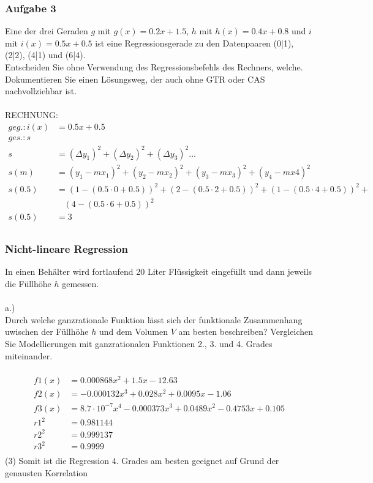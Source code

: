 \documentclass[a4paper,12pt]{article}
\begin{document}
\subsubsection{Aufgabe 3}
Eine der drei Geraden $g$ mit $g(x) = 0.2x + 1.5$, $h$ mit $h(x) = 0.4x + 0.8$
und $i$ mit $i(x) = 0.5x + 0.5$ ist eine Regressionsgerade zu den Datenpaaren (0|1), 
(2|2), (4|1) und (6|4).\\
Entscheiden Sie ohne Verwendung des Regressionsbefehls des Rechners, welche. Dokumentieren
Sie einen Lösungsweg, der auch ohne GTR oder CAS\\
nachvollziehbar ist.\\
\\
RECHNUNG:\\
\begin{equation}
\begin{split}
geg.: i(x) & = 0.5x + 0.5\\
ges.: s\ \ \ \ &\\
s & = (\Delta y_1)^2 + (\Delta y_2)^2 + (\Delta y_3)^2 ...\\
s(m) & = (y_1 - mx_1)^2 + (y_2 - mx_2)^2 + (y_3 - mx_3)^2 + (y_4 - mx4)^2\\
s(0.5) & = (1 - (0.5 \cdot 0 + 0.5))^2 + (2 - (0.5 \cdot 2 + 0.5))^2 + (1 - (0.5 \cdot 4 + 0.5))^2 + \\
&\ \ \ \ (4 - (0.5 \cdot 6 + 0.5))^2\\
s(0.5) & = 3\\
\end{split}
\end{equation}
\pagebreak
\subsubsection{Nicht-lineare Regression}
In einen Behälter wird fortlaufend 20 Liter Flüssigkeit eingefüllt und dann jeweils die Füllhöhe $h$ gemessen.\\
\\
a.)\\
Durch welche ganzrationale Funktion lässt sich der funktionale Zusammenhang uwischen der Füllhöhe $h$ und dem Volumen $V$
am besten beschreiben? Vergleichen Sie Modellierungen mit ganzrationalen Funktionen 2., 3. und 4. Grades miteinander.\\\\
\begin{equation}
\begin{split}
f1(x) & = 0.000868x^2 + 1.5x -12.63\\
f2(x) & = -0.000132x^3+0.028x^2+0.0095x-1.06\\
f3(x) & = 8.7 \cdot 10^{-7} x^4-0.000373x^3 + 0.0489x^2 - 0.4753x + 0.105\\
r1^2 & = 0.981144\\
r2^2 & = 0.999137\\
r3^2 & = 0.9999\\
\end{split}
\end{equation}
(3) Somit ist die Regression 4. Grades am besten geeignet auf Grund der genausten Korrelation 
\pagebreak
\end{document}
